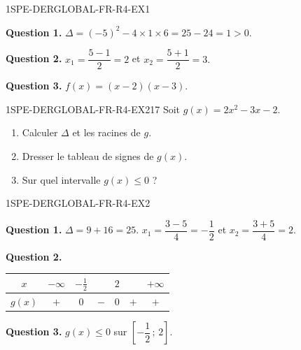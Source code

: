 \begin{corrige}{1SPE-DERGLOBAL-FR-R4-EX1}

\textbf{Question 1.}
$\Delta = (-5)^2 - 4 \times 1 \times 6 = 25 - 24 = 1 > 0.$

\textbf{Question 2.}
$x_1 = \dfrac{5 - 1}{2} = 2$ et $x_2 = \dfrac{5 + 1}{2} = 3.$

\textbf{Question 3.}
$f(x) = (x - 2)(x - 3).$

\end{corrige}


\begin{exercice}{1SPE-DERGLOBAL-FR-R4-EX2}{1}{7}
Soit $g(x) = 2x^2 - 3x - 2$.
\begin{enumerate}
  \item Calculer $\Delta$ et les racines de $g$.
  \item Dresser le tableau de signes de $g(x)$.
  \item Sur quel intervalle $g(x) \leqslant 0$ ?
\end{enumerate}
\end{exercice}


\begin{corrige}{1SPE-DERGLOBAL-FR-R4-EX2}

\textbf{Question 1.}
$\Delta = 9 + 16 = 25$.
$x_1 = \dfrac{3 - 5}{4} = -\dfrac{1}{2}$ et $x_2 = \dfrac{3 + 5}{4} = 2.$

\textbf{Question 2.}
\begin{center}
\begin{tabular}{|c|cccccc|}
\hline
$x$ & $-\infty$ & $-\frac{1}{2}$ & & $2$ & & $+\infty$ \\
\hline
$g(x)$ & $+$ & $0$ & $-$ & $0$ & $+$ & $+$ \\
\hline
\end{tabular}
\end{center}


\textbf{Question 3.}
$g(x) \leqslant 0$ sur $\left[-\dfrac{1}{2}\,;\,2\right].$

\end{corrige}

